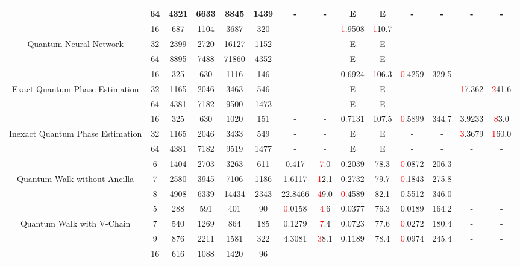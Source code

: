 \begin{table}[htb]
{\begin{tabular}{|c|c|c|c|c|c|c|c|c|c|c|c|c|c|}
 \\
 & 
64 & 4321 & 6633 & 8845 & 1439
 & - & -
 & E & E
 & - & -
 & - & -
 \\
\hline
 & 
16 & 687 & 1104 & 3687 & 320
 & - & -
 & \textcolor{red}1.9508 & \textcolor{red}110.7
 & - & -
 & - & -
 \\
Quantum Neural Network & 
32 & 2399 & 2720 & 16127 & 1152
 & - & -
 & E & E
 & - & -
 & - & -
 \\
 & 
64 & 8895 & 7488 & 71860 & 4352
 & - & -
 & E & E
 & - & -
 & - & -
 \\
\hline
 & 
16 & 325 & 630 & 1116 & 146
 & - & -
 & 0.6924 & \textcolor{red}106.3
 & \textcolor{red}0.4259 & 329.5
 & - & -
 \\
Exact Quantum Phase Estimation & 
32 & 1165 & 2046 & 3463 & 546
 & - & -
 & E & E
 & - & -
 & \textcolor{red}17.362 & \textcolor{red}241.6
 \\
 & 
64 & 4381 & 7182 & 9500 & 1473
 & - & -
 & E & E
 & - & -
 & - & -
 \\
\hline
 & 
16 & 325 & 630 & 1020 & 151
 & - & -
 & 0.7131 & 107.5
 & \textcolor{red}0.5899 & 344.7
 & 3.9233 & \textcolor{red}83.0
 \\
Inexact Quantum Phase Estimation & 
32 & 1165 & 2046 & 3433 & 549
 & - & -
 & E & E
 & - & -
 & \textcolor{red}3.3679 & \textcolor{red}160.0
 \\
 & 
64 & 4381 & 7182 & 9519 & 1477
 & - & -
 & E & E
 & - & -
 & - & -
 \\
\hline
 & 
6 & 1404 & 2703 & 3263 & 611
 & 0.417 & \textcolor{red}7.0
 & 0.2039 & 78.3
 & \textcolor{red}0.0872 & 206.3
 & - & -
 \\
Quantum Walk without Ancilla & 
7 & 2580 & 3945 & 7106 & 1186
 & 1.6117 & \textcolor{red}12.1
 & 0.2732 & 79.7
 & \textcolor{red}0.1843 & 275.8
 & - & -
 \\
 & 
8 & 4908 & 6339 & 14434 & 2343
 & 22.8466 & \textcolor{red}49.0
 & \textcolor{red}0.4589 & 82.1
 & 0.5512 & 346.0
 & - & -
 \\
\hline
 & 
5 & 288 & 591 & 401 & 90
 & \textcolor{red}0.0158 & \textcolor{red}4.6
 & 0.0377 & 76.3
 & 0.0189 & 164.2
 & - & -
 \\
Quantum Walk with V-Chain & 
7 & 540 & 1269 & 864 & 185
 & 0.1279 & \textcolor{red}7.4
 & 0.0723 & 77.6
 & \textcolor{red}0.0272 & 180.4
 & - & -
 \\
 & 
9 & 876 & 2211 & 1581 & 322
 & 4.3081 & \textcolor{red}38.1
 & 0.1189 & 78.4
 & \textcolor{red}0.0974 & 245.4
 & - & -
 \\
\hline
 & 
16 & 616 & 1088 & 1420 & 96

\end{tabular}}
\end{table}
